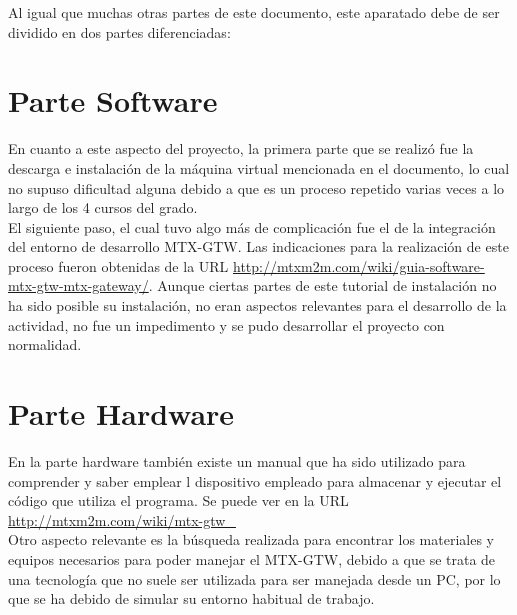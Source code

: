 
Al igual que muchas otras partes de este documento, este aparatado debe de ser dividido en dos partes diferenciadas:

\section{Parte Software}

En cuanto a este aspecto del proyecto, la primera parte que se realizó fue la descarga e instalación de la máquina virtual mencionada en el documento, lo cual no supuso dificultad alguna debido a que es un proceso repetido varias veces a lo largo de los 4 cursos del grado.\\
El siguiente paso, el cual tuvo algo más de complicación fue el de la integración del entorno de desarrollo MTX-GTW. Las indicaciones para la realización de este proceso fueron obtenidas de la URL \url{http://mtxm2m.com/wiki/guia-software-mtx-gtw-mtx-gateway/}. Aunque ciertas partes de este tutorial de instalación no ha sido posible su instalación, no eran aspectos relevantes para el desarrollo de la actividad, no fue un impedimento y se pudo desarrollar el proyecto con normalidad.\\

\section{Parte Hardware}

En la parte hardware también existe un manual que ha sido utilizado para comprender y saber emplear l dispositivo empleado para almacenar y ejecutar el código que utiliza el programa. Se puede ver en la URL \url{ http://mtxm2m.com/wiki/mtx-gtw_}\\
Otro aspecto relevante es la búsqueda realizada para encontrar los materiales y equipos necesarios para poder manejar el MTX-GTW, debido a que se trata de una tecnología que no suele ser utilizada para ser manejada desde un PC, por lo que se ha debido de simular su entorno habitual de trabajo.\\